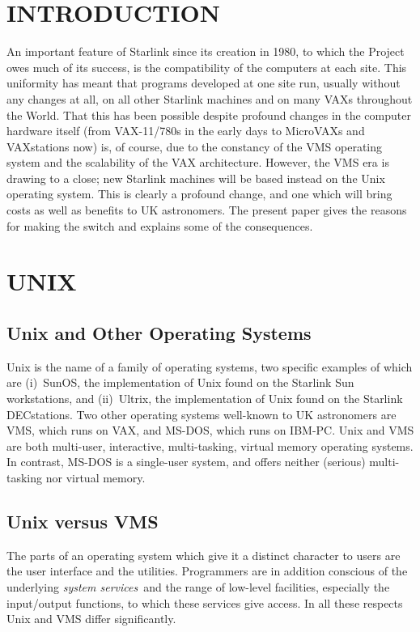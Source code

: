 \vspace{0.5mm}

\setlength{\parskip}{0mm}
\tableofcontents
\setlength{\parskip}{\medskipamount}
\markright{\stardocname}

\pagebreak

\section{INTRODUCTION}
An important feature of Starlink since its creation in 1980, to which
the Project owes much of its success, is the compatibility of the
computers at each site.  This uniformity has meant that programs
developed at one site run, usually without any changes at all, on all
other Starlink machines and on many VAXs throughout the World.  That
this has been possible despite profound changes in the computer hardware
itself (from VAX-11/780s in the early days to MicroVAXs and VAXstations
now) is, of course, due to the constancy of the VMS operating system and
the scalability of the VAX architecture.  However, the VMS era is
drawing to a close;  new Starlink machines will be based instead on the
Unix operating system.  This is clearly a profound change, and one which
will bring costs as well as benefits to UK astronomers.  The present
paper gives the reasons for making the switch and explains some of the
consequences.

\section{UNIX}
\subsection{Unix and Other Operating Systems}
Unix is the name of a family of operating systems, two specific examples
of which are (i)~SunOS, the implementation of Unix found on the Starlink
Sun workstations, and (ii)~Ultrix, the implementation of Unix found on
the Starlink DECstations.  Two other operating systems well-known to UK
astronomers are VMS, which runs on VAX, and MS-DOS, which runs on
IBM-PC.  Unix and VMS are both multi-user, interactive, multi-tasking,
virtual memory operating systems.  In contrast, MS-DOS is a single-user
system, and offers neither (serious) multi-tasking nor virtual memory.

\subsection{Unix versus VMS}
The parts of an operating system which give it a distinct character to
users are the user interface and the utilities.  Programmers are in
addition conscious of the underlying {\it system services}\, and the
range of low-level facilities, especially the input/output functions, to
which these services give access.  In all these respects Unix and VMS
differ significantly.

